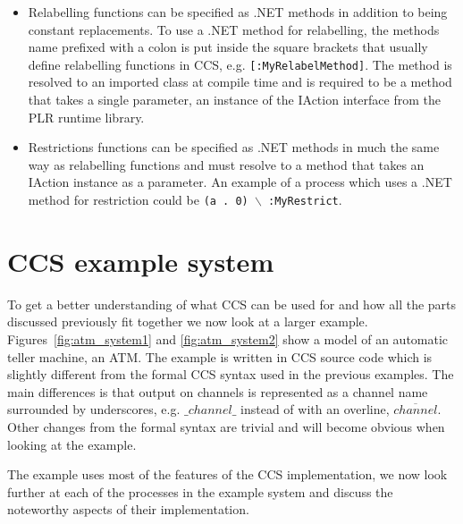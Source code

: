 \begin{itemize}
		\item Relabelling functions can be specified as .NET methods in addition 
		to being constant replacements. To use a .NET method for relabelling, the 
		methods name prefixed with a colon is put inside the square brackets 
		that usually define relabelling functions in CCS, e.g.
		\texttt{[:MyRelabelMethod]}. The method is resolved to an imported class 
		at compile time and is required to be a method that takes a single 
		parameter, an instance of the \textsf{IAction} interface from the PLR 
		runtime library.
		
		\item Restrictions functions can be specified as .NET methods in much the 
		same way as relabelling functions and must resolve to a method that takes 
		an \textsf{IAction} instance as a parameter. An example of a process which 
		uses a .NET method for restriction could be \texttt{(a . 0) $\backslash$ :MyRestrict}.

	\end{itemize}

\section{CCS example system}

  To get a better understanding of what CCS can be used for and how all the 
  parts discussed previously fit together we now look at a larger example. 
  Figures~\ref{fig:atm_system1} and \ref{fig:atm_system2} show a model 
  of an automatic teller machine, an ATM. The example is written in CCS source 
  code which is slightly different from the formal CCS syntax used in the 
  previous examples. The main differences is that output on channels is 
  represented as a channel name surrounded by underscores, e.g. $\_channel\_$ 
  instead of with an overline, $\overline{channel}$. Other changes from the 
  formal syntax are trivial and will become obvious when looking at the 
  example.
  
  The example uses most of the features of the CCS implementation, we now look 
  further at each of the processes in the example system and discuss the 
  noteworthy aspects of their implementation.
  
  
  
